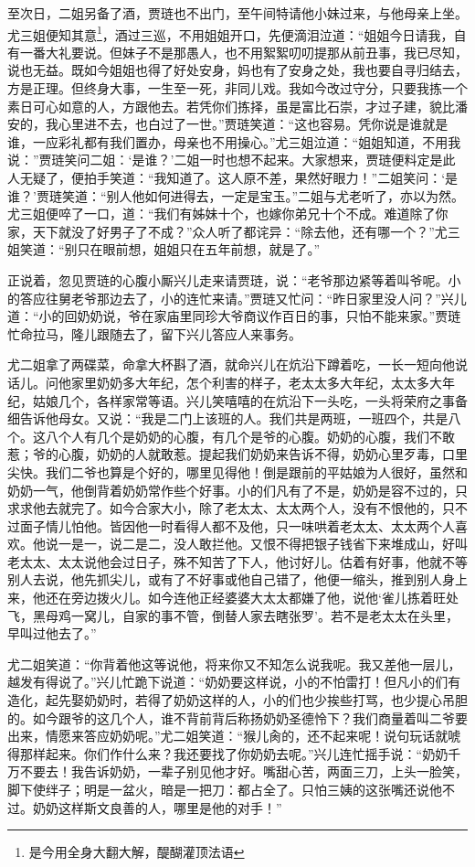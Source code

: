 \documentclass[12pt,oneside]{book}
\begin{document}
至次日，二姐另备了酒，贾琏也不出门，至午间特请他小妹过来，与他母亲上坐。尤三姐便知其意\footnote{是今用全身大翻大解，醍醐灌顶法语}，酒过三巡，不用姐姐开口，先便滴泪泣道：“姐姐今日请我，自有一番大礼要说。但妹子不是那愚人，也不用絮絮叨叨提那从前丑事，我已尽知，说也无益。既如今姐姐也得了好处安身，妈也有了安身之处，我也要自寻归结去，方是正理。但终身大事，一生至一死，非同儿戏。我如今改过守分，只要我拣一个素日可心如意的人，方跟他去。若凭你们拣择，虽是富比石崇，才过子建，貌比潘安的，我心里进不去，也白过了一世。”贾琏笑道：“这也容易。凭你说是谁就是谁，一应彩礼都有我们置办，母亲也不用操心。”尤三姐泣道：“姐姐知道，不用我说：”贾琏笑问二姐：‘是谁？’二姐一时也想不起来。大家想来，贾琏便料定是此人无疑了，便拍手笑道：“我知道了。这人原不差，果然好眼力！”二姐笑问：‘是谁？’贾琏笑道：“别人他如何进得去，一定是宝玉。”二姐与尤老听了，亦以为然。尤三姐便啐了一口，道：“我们有姊妹十个，也嫁你弟兄十个不成。难道除了你家，天下就没了好男子了不成？”众人听了都诧异：“除去他，还有哪一个？”尤三姐笑道：“别只在眼前想，姐姐只在五年前想，就是了。”

正说着，忽见贾琏的心腹小厮兴儿走来请贾琏，说：“老爷那边紧等着叫爷呢。小的答应往舅老爷那边去了，小的连忙来请。”贾琏又忙问：“昨日家里没人问？”兴儿道：“小的回奶奶说，爷在家庙里同珍大爷商议作百日的事，只怕不能来家。”贾琏忙命拉马，隆儿跟随去了，留下兴儿答应人来事务。

尤二姐拿了两碟菜，命拿大杯斟了酒，就命兴儿在炕沿下蹲着吃，一长一短向他说话儿。问他家里奶奶多大年纪，怎个利害的样子，老太太多大年纪，太太多大年纪，姑娘几个，各样家常等语。兴儿笑嘻嘻的在炕沿下一头吃，一头将荣府之事备细告诉他母女。又说：“我是二门上该班的人。我们共是两班，一班四个，共是八个。这八个人有几个是奶奶的心腹，有几个是爷的心腹。奶奶的心腹，我们不敢惹；爷的心腹，奶奶的人就敢惹。提起我们奶奶来告诉不得，奶奶心里歹毒，口里尖快。我们二爷也算是个好的，哪里见得他！倒是跟前的平姑娘为人很好，虽然和奶奶一气，他倒背着奶奶常作些个好事。小的们凡有了不是，奶奶是容不过的，只求求他去就完了。如今合家大小，除了老太太、太太两个人，没有不恨他的，只不过面子情儿怕他。皆因他一时看得人都不及他，只一味哄着老太太、太太两个人喜欢。他说一是一，说二是二，没人敢拦他。又恨不得把银子钱省下来堆成山，好叫老太太、太太说他会过日子，殊不知苦了下人，他讨好儿。估着有好事，他就不等别人去说，他先抓尖儿，或有了不好事或他自己错了，他便一缩头，推到别人身上来，他还在旁边拨火儿。如今连他正经婆婆大太太都嫌了他，说他‘雀儿拣着旺处飞，黑母鸡一窝儿，自家的事不管，倒替人家去瞎张罗’。若不是老太太在头里，早叫过他去了。”

尤二姐笑道：“你背着他这等说他，将来你又不知怎么说我呢。我又差他一层儿，越发有得说了。”兴儿忙跪下说道：“奶奶要这样说，小的不怕雷打！但凡小的们有造化，起先娶奶奶时，若得了奶奶这样的人，小的们也少挨些打骂，也少提心吊胆的。如今跟爷的这几个人，谁不背前背后称扬奶奶圣德怜下？我们商量着叫二爷要出来，情愿来答应奶奶呢。”尤二姐笑道：“猴儿肏的，还不起来呢！说句玩话就唬得那样起来。你们作什么来？我还要找了你奶奶去呢。”兴儿连忙摇手说：“奶奶千万不要去！我告诉奶奶，一辈子别见他才好。嘴甜心苦，两面三刀，上头一脸笑，脚下使绊子；明是一盆火，暗是一把刀：都占全了。只怕三姨的这张嘴还说他不过。奶奶这样斯文良善的人，哪里是他的对手！”
\end{document}
